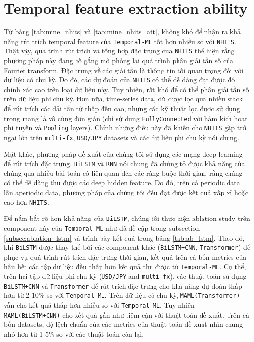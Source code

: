 \section{Temporal feature extraction ability}

Từ bảng \ref{tab:mine_nhits} và \ref{tab:mine_nhits_att}, không khó để nhận ra khả năng rút trích temporal feature của \verb|Temporal-ML| tốt hơn nhiều so với \verb|NHITS|. Thật vậy, quá trình rút trích và tổng hợp đặc trưng của \verb|NHITS| thể hiện rằng phương pháp này đang cố gắng mô phỏng lại quá trình phân giải tần số của Fourier transform. Đặc trưng về các giải tần là thông tin tối quan trọng đối với dữ liệu có chu kỳ. Do đó, các dự đoán của \verb|NHITS| có thể dễ dàng đạt được độ chính xác cao trên loại dữ liệu này. Tuy nhiên, rất khó để có thể phân giải tần số trên dữ liệu phi chu kỳ. Hơn nữa, time-series data, dù được lọc qua nhiều stack để rút trích các dải tần từ thấp đến cao, nhưng các kỹ thuật lọc được sử dụng trong mạng là vô cùng đơn giản (chỉ sử dụng \verb|FullyConnected| với hàm kích hoạt phi tuyến và \verb|Pooling| layers). Chính những điều này đã khiến cho \verb|NHITS| gặp trở ngại lớn trên \verb|multi-fx|, \verb|USD/JPY| datasets và các dữ liệu phi chu kỳ nói chung.

Mặt khác, phương pháp đề xuất của chúng tôi sử dụng các mạng deep learning để rút trích đặc trưng. \verb|BiLSTM| và \verb|RNN| nói chung đã chúng tỏ được khả năng của chúng qua nhiều bài toán có liên quan đến các ràng buộc thời gian, rằng chúng có thể dễ dàng thu được các deep hidden feature. Do đó, trên cả periodic data lẫn aperiodic data, phương pháp của chúng tôi đều đạt được kết quả xấp xỉ hoặc cao hơn \verb|NHITS|.

Để nắm bắt rõ hơn khả năng của \verb|BiLSTM|, chúng tôi thực hiện ablation study trên component này của \verb|Temporal-ML| như đã đề cập trong subsection \ref{subsec:ablation_lstm} và trình bày kết quả trong bảng \ref{tab:ab_lstm}. Theo đó, khi \verb|BiLSTM| được thay thế bởi các component khác (\verb|BiLSTM+CNN|, \verb|Transformer|) để phục vụ quá trình rút trích đặc trưng thời gian, kết quả  trên cả bốn metrics của hầu hết các tập dữ liệu đều thấp hơn kết quả thu được từ \verb|Temporal-ML|. Cụ thể, trên hai tập dữ liệu phi chu kỳ (\verb|USD/JPY| and \verb|multi-fx|), các thuật toán sử dụng \verb|BiLSTM+CNN| và \verb|Transformer| để rút trích đặc trưng cho khả năng dự đoán thấp hơn từ 2-10\% so với \verb|Temporal-ML|. Trên dữ liệu có chu kỳ, \verb|MAML(Transformer)| vẫn cho kết quả thấp hơn nhiều so với \verb|Temporal-ML|. Tuy nhiên \verb|MAML(BiLSTM+CNN)| cho kết quả gần như tiệm cận với thuật toán đề xuất. Trên cả bốn datasets, độ lệch chuẩn của các metrics của thuật toán đề xuất nhìn chung nhỏ hơn từ 1-5\% so với các thuật toán còn lại.

